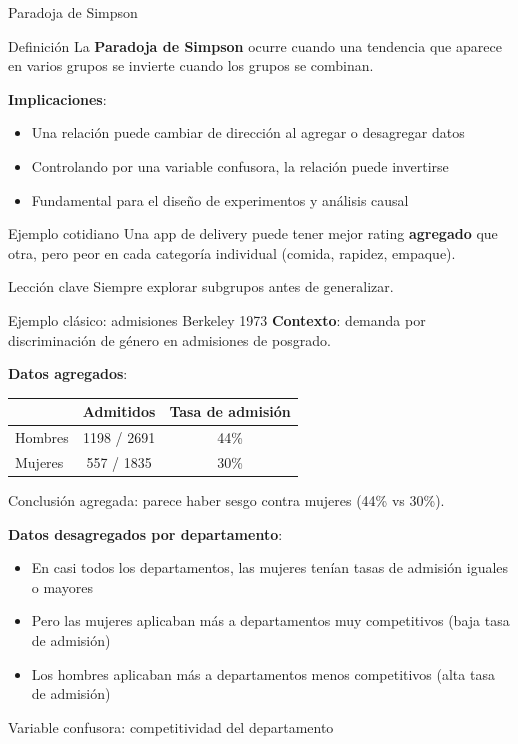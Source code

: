 \documentclass[aspectratio=169, 11pt]{beamer}
\begin{document}
\begin{frame}{Paradoja de Simpson}
\begin{block}{Definición}
La \textbf{Paradoja de Simpson} ocurre cuando una tendencia que aparece en varios grupos \alert{se invierte} cuando los grupos se combinan.
\end{block}

\small
\textbf{Implicaciones}:
\begin{itemize}\setlength{\itemsep}{1pt}
\item Una relación puede cambiar de dirección al agregar o desagregar datos
\item Controlando por una variable confusora, la relación puede invertirse
\item Fundamental para el diseño de experimentos y análisis causal
\end{itemize}

\begin{exampleblock}{Ejemplo cotidiano}
Una app de delivery puede tener mejor rating \textbf{agregado} que otra, pero peor en cada categor\'ia individual (comida, rapidez, empaque).
\end{exampleblock}

\begin{alertblock}{Lecci\'on clave}
\alert{Siempre explorar subgrupos antes de generalizar}.
\end{alertblock}
\end{frame}

\begin{frame}{Ejemplo clásico: admisiones Berkeley 1973}
\small
\textbf{Contexto}: demanda por discriminación de género en admisiones de posgrado.

\vspace{0.3em}
\textbf{Datos agregados}:
\begin{table}
\centering
\begin{tabular}{lcc}
\toprule
& Admitidos & Tasa de admisión \\
\midrule
Hombres & 1198 / 2691 & 44\% \\
Mujeres & 557 / 1835 & 30\% \\
\bottomrule
\end{tabular}
\end{table}

Conclusión agregada: parece haber sesgo contra mujeres (44\% vs 30\%).

\vspace{0.5em}
\textbf{Datos desagregados por departamento}:
\begin{itemize}
\item En casi todos los departamentos, las mujeres tenían tasas de admisión \alert{iguales o mayores}
\item Pero las mujeres aplicaban más a departamentos muy competitivos (baja tasa de admisión)
\item Los hombres aplicaban más a departamentos menos competitivos (alta tasa de admisión)
\end{itemize}

\alert{Variable confusora}: competitividad del departamento
\end{frame}
\end{document}
